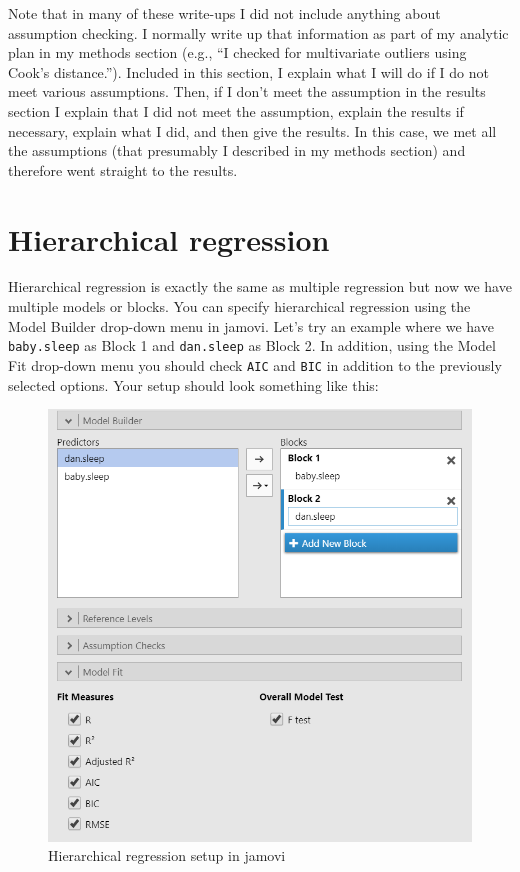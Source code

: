 \documentclass[
]{book}
\begin{document}
Note that in many of these write-ups I did not include anything about assumption checking. I normally write up that information as part of my analytic plan in my methods section (e.g., ``I checked for multivariate outliers using Cook's distance.''). Included in this section, I explain what I will do if I do not meet various assumptions. Then, if I don't meet the assumption in the results section I explain that I did not meet the assumption, explain the results if necessary, explain what I did, and then give the results. In this case, we met all the assumptions (that presumably I described in my methods section) and therefore went straight to the results.

\hypertarget{hierarchical-regression}{%
\section{Hierarchical regression}\label{hierarchical-regression}}

Hierarchical regression is exactly the same as multiple regression but now we have multiple models or blocks. You can specify hierarchical regression using the Model Builder drop-down menu in jamovi. Let's try an example where we have \texttt{baby.sleep} as Block 1 and \texttt{dan.sleep} as Block 2. In addition, using the Model Fit drop-down menu you should check \texttt{AIC} and \texttt{BIC} in addition to the previously selected options. Your setup should look something like this:

\begin{figure}

{\centering \includegraphics[width=1\linewidth]{images/13-regression/hierarchical-setup} 

}

\caption{Hierarchical regression setup in jamovi}\label{fig:unnamed-chunk-12}
\end{figure}
\end{document}
